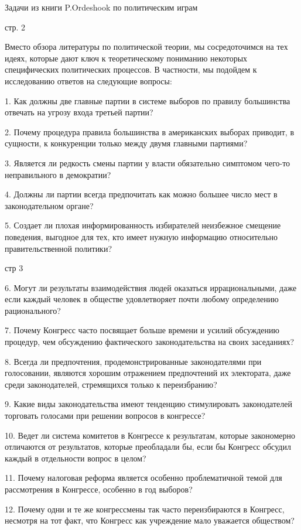 \documentclass[a4paper,12pt]{article}
\begin{document}
{\Large Задачи из книги P.Ordeshook по политическим
играм}



стр. 2

Вместо обзора литературы по политической теории, мы
сосредоточимся на тех идеях, которые дают ключ к
теоретическому пониманию некоторых специфических
политических процессов. В частности, мы подойдем к
исследованию ответов на следующие вопросы:

1. Как должны две главные партии в системе выборов
по правилу большинства отвечать на угрозу входа
третьей партии?

2. Почему процедура правила большинства в
американских выборах приводит, в сущности, к
конкуренции только между двумя главными партиями?

3. Является ли редкость смены партии у власти
обязательно симптомом чего-то неправильного в
демократии?

4. Должны ли партии всегда предпочитать как можно
большее число мест в законодательном органе?

5. Создает ли плохая информированность избирателей
неизбежное смещение поведения, выгодное для тех,
кто имеет нужную информацию относительно
правительственной политики?

стр 3

6. Могут ли результаты взаимодействия людей
оказаться иррациональными, даже если каждый человек
в обществе удовлетворяет почти любому определению
рационального?

7. Почему Конгресс часто посвящает больше времени и
усилий обсуждению процедур, чем обсуждению
фактического законодательства на своих заседаниях?

8. Всегда ли предпочтения, продемонстрированные
законодателями при голосовании, являются хорошим
отражением предпочтений их электората, даже среди
законодателей, стремящихся только к переизбранию?

9. Какие виды законодательства имеют тенденцию
стимулировать законодателей торговать голосами при
решении вопросов в конгрессе?

10. Ведет ли система комитетов в Конгрессе к
результатам, которые закономерно отличаются от
результатов, которые преобладали бы, если бы
Конгресс обсудил каждый в отдельности вопрос в
целом?

11. Почему налоговая реформа является особенно
проблематичной темой для рассмотрения в Конгрессе,
особенно в год выборов?

12. Почему одни и те же конгрессмены так часто
переизбираются в Конгресс, несмотря на тот факт,
что Конгресс как учреждение мало уважается
обществом?
\end{document}
